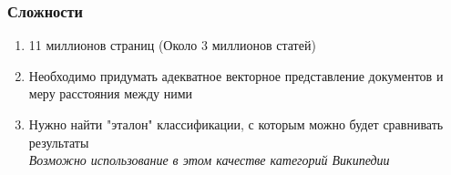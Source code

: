 \documentclass{beamer}
\begin{document}
\begin{frame}
\frametitle{Сложности}
\begin{enumerate}

\item {
11 миллионов страниц (Около 3 миллионов статей)
}
\item {
Необходимо придумать адекватное векторное представление документов и меру расстояния между ними
}
\item {
Нужно найти "эталон" классификации, с которым можно будет сравнивать результаты\\
{\it Возможно использование в этом качестве категорий Википедии}
}

\end{enumerate}
\end{frame}
\end{document}
